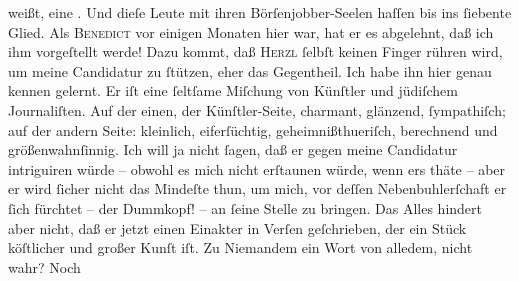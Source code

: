 \begin{ledgroupsized}[t]{13cm}
               weißt, eine \label{K_L02619-4v}\label{K_L02619-4h}. Und dieſe Leute mit ihren
               Börſenjobber-Seelen haſſen bis ins ſiebente Glied. Als \textsc{Benedict} vor einigen Monaten hier war, hat er es abgelehnt, daß ich ihm vorgeſtellt
               werde! Dazu kommt, daß \textsc{Herzl} ſelbſt keinen Finger rühren wird, um meine Candidatur zu ſtützen, eher das
               Gegentheil. Ich habe ihn hier genau kennen gelernt. Er iſt {\pb}eine ſeltſame Miſchung von Künſtler und jüdiſchem
               Journaliſten. Auf der einen, der Künſtler-Seite, charmant, glänzend, ſympathiſch; auf
               der andern Seite: kleinlich, eiferſüchtig,  geheimnißthueriſch, berechnend und größenwahnſinnig. Ich will ja nicht ſagen,
               daß er gegen meine Candidatur intriguiren würde – obwohl es mich nicht erſtaunen
               würde, wenn ers thäte – aber er wird ſicher nicht das Mindeſte thun, um mich, vor
               deſſen Nebenbuhlerſchaft er ſich fürchtet – der Dummkopf! – an ſeine Stelle zu bringen. Das Alles hindert
               aber {\pb}nicht, daß er jetzt einen Einakter in Verſen geſchrieben, der ein Stück
               köſtlicher und großer Kunſt iſt. Zu Niemandem ein Wort von alledem, nicht wahr? Noch

\end{ledgroupsized}
